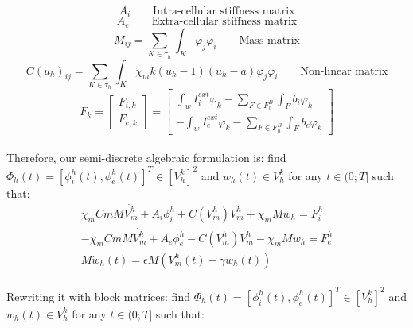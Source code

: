 \documentclass[a4paper,11pt]{article}
\begin{document}
\begin{equation}
A_i \qquad{\text{Intra-cellular stiffness matrix}}
\end{equation}
\begin{equation}
A_e \qquad{\text{Extra-cellular stiffness matrix}}
\end{equation}
\begin{equation}
M_{ij} = \sum_{K \in \tau_h}\int_K\varphi_j\varphi_i \qquad{\text{Mass matrix}}
\end{equation}
\begin{equation}
C(u_h)_{ij} =  \sum_{K \in \tau_h} \int_K \chi_m k(u_h-1)(u_h-a)\varphi_j\varphi_i \qquad{\text{Non-linear matrix}}
\end{equation}
\begin{equation}
F_k=\begin{bmatrix} F_{i,k} \\ F_{e,k} \end{bmatrix}=\begin{bmatrix} \int_{w} I_i^{ext}\varphi_k - \sum_{F \in F_h^B} \int_F b_i\varphi_k \\ - \int_{w} I_e^{ext}\varphi_k - \sum_{F \in F_h^B} \int_F b_e\varphi_k \end{bmatrix}
\end{equation}
\vspace{3mm} \\
Therefore, our semi-discrete algebraic formulation is: \vspace{3mm} \newline
find $\Phi_h(t)=[\phi_i^h(t),\phi_e^h(t)]^T \in [V_h^k]^2$ and $w_h(t) \in V_h^k$ for any $t \in (0;T]$ such that:
\begin{equation}\label{algebraic}
\begin{gathered}
\chi_m Cm M \dot{V_m^h}+A_i \phi_i^h+C(V_m^h) V_m^h+\chi_m M w_h=F_i^h\\
-\chi_m Cm M \dot{V_m^h}+A_e \phi_e^h-C(V_m^h) V_m^h-\chi_m M w_h=F_e^h\\
M \dot{w}_h(t)=\epsilon M (V_m^h(t)-\gamma w_h(t))
\end{gathered}
\end{equation}
 \vspace{5mm} \\
 Rewriting it with block matrices: \vspace{5mm} \newline
 find $\Phi_h(t)=[\phi_i^h(t),\phi_e^h(t)]^T \in [V_h^k]^2$ and $w_h(t) \in V_h^k$ for any $t \in (0;T]$ such that:
\end{document}
